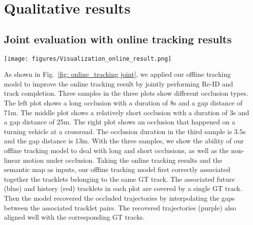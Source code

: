 \documentclass{article} \usepackage{iclr2023_conference,times}
\begin{document}
\section{Qualitative results}
\label{sec: Qualitative results}
\subsection{Joint evaluation with online tracking results}
\begin{figure*}[htb!]
\centering
\texttt{[image: figures/Visualization\_online\_result.png]}
\caption{Qualitative results of the offline tracking model. In each sample, GT boxes are plotted as rectangles. Each GT track is represented by a unique color. To separate the output of the model from the GT tracks, we use arrows to represent the output poses from the model instead of rectangles. Red and blue arrows are the history and future tracklets matched by the offline Re-ID model. The recovered trajectories are plotted as purple arrows. The orange dotted lines are the lanes. In the background, the white area is drivable. The gray area in the right plot is the pedestrian crossing. The red cross is the average position of the ego vehicle during the occlusion. }
\label{fig: online_tracking joint}
\end{figure*}
As shown in Fig.~\ref{fig: online_tracking joint}, we applied our offline tracking model to improve the online tracking result by jointly performing Re-ID and track completion. Three samples in the three plots show different occlusion types. The left plot shows a long occlusion with a duration of 8s and a gap distance of 71m. The middle plot shows a relatively short occlusion with a duration of 3s and a gap distance of 25m. The right plot shows an occlusion that happened on a turning vehicle at a crossroad. The occlusion duration in the third sample is 3.5s and the gap distance is 13m. With the three samples, we show the ability of our offline tracking model to deal with long and short occlusions, as well as the non-linear motion under occlusion. Taking the online tracking results and the semantic map as inputs, our offline tracking model first correctly associated together the tracklets belonging to the same GT track. The associated future (blue) and history (red) tracklets in each plot are covered by a single GT track. Then the model recovered the occluded trajectories by interpolating the gaps between the associated tracklet pairs. The recovered trajectories (purple) also aligned well with the corresponding GT tracks.  
\end{document}
